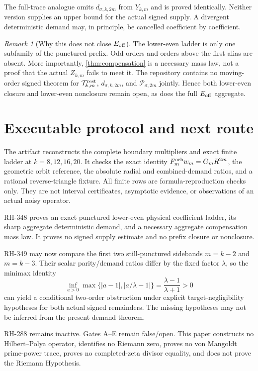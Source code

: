 \documentclass[11pt]{article}
\theoremstyle{remark}
\newtheorem{remark}[theorem]{Remark}
\newcommand{\cP}{\mathcal P}
\newcommand{\cT}{\mathcal T}
\begin{document}
The full-trace analogue omits $d_{\sigma,k,2m}$ from $Y_{k,m}$ and is proved
identically.  Neither version supplies an upper bound for the actual signed
supply.  A divergent deterministic demand may, in principle, be cancelled
coefficient by coefficient.

\begin{remark}[Why this does not close $E_{\rm off}$]
The lower-even ladder is only one subfamily of the punctured prefix.  Odd
orders and orders above the first alias are absent.  More importantly,
\cref{thm:compensation} is a necessary mass law, not a proof that the actual
$Z_{k,m}$ fails to meet it.  The repository contains no moving-order signed
theorem for $\cT_{k,m}^{\rm rest}$, $d_{\sigma,k,2m}$, and
$\cP_{\sigma,2m}$ jointly.  Hence both lower-even closure and lower-even
nonclosure remain open, as does the full $E_{\rm off}$ aggregate.
\end{remark}

\section{Executable protocol and next route}

The artifact reconstructs the complete boundary multipliers and exact
finite ladder at $k=8,12,16,20$.  It checks the exact identity
$F_m^{\rm orb}w_m=G_mR^{2m}$, the geometric orbit reference, the absolute
radial and combined-demand ratios, and a rational reverse-triangle fixture.
All finite rows are formula-reproduction checks only.  They are not interval
certificates, asymptotic evidence, or observations of an actual noisy
operator.

RH-348 proves an exact punctured lower-even physical coefficient ladder, its
sharp aggregate deterministic demand, and a necessary aggregate
compensation mass law.  It proves no signed supply estimate and no prefix
closure or nonclosure.

RH-349 may now compare the first two still-punctured sidebands
$m=k-2$ and $m=k-3$.  Their scalar parity/demand ratios differ by the fixed
factor $\lambda$, so the minimax identity
\[
 \inf_{a>0}\max\{|a-1|,|a/\lambda-1|\}
 =\frac{\lambda-1}{\lambda+1}>0
\]
can yield a conditional two-order obstruction under explicit
target-negligibility hypotheses for both actual signed remainders.  The
missing hypotheses may not be inferred from the present demand theorem.

RH-288 remains inactive.  Gates A--E remain false/open.  This paper
constructs no Hilbert--Polya operator, identifies no Riemann zero, proves no
von Mangoldt prime-power trace, proves no completed-zeta divisor equality,
and does not prove the Riemann Hypothesis.



\end{document}
